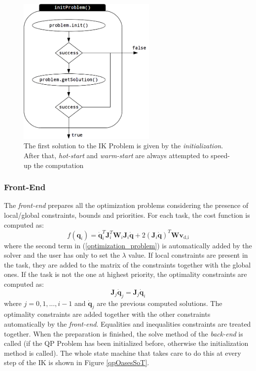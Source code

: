 \begin{figure}[htb] 
\centering 
\includegraphics[width=0.6\textwidth]{gfx/QPOasesProblem_init2.png} 
\caption{The first solution to the IK Problem is given by the \emph{initialization}. After that, \emph{hot-start} and \emph{warm-start} are always attempted to speed-up the computation} 
\label{qpOasesProblemInit}
\end{figure}

\subsubsection{Front-End}
The \emph{front-end} prepares all the optimization problems considering the presence of local/global constraints, bounds and priorities. For each task, the cost function is computed as:
\begin{equation}
f(\mathbf{q}_i) = \mathbf{\dot{q}}_i^T\mathbf{J}_i^T\mathbf{W}_i\mathbf{J}_i\mathbf{\dot{q}} + 2(\mathbf{J}_i\mathbf{\dot{q}})^T\mathbf{W}\mathbf{v}_\text{d,i}
\label{cost_function}
\end{equation}
where the second term in (\ref{optimization_problem}) is automatically added by the solver and the user has only to set the $\lambda$ value. If local constraints are present in the task, they are added to the matrix of the constraints together with the global ones. If the task is not the one at highest priority, the optimality constraints are computed as:
\begin{equation}
\mathbf{J}_{j}\mathbf{\dot{q}}_{j} = \mathbf{J}_{j}\mathbf{\dot{q}}_i
\label{optimality_constraints}
\end{equation}
where $j = 0, 1, ..., i-1$ and $\mathbf{\dot{q}}_{j}$ are the previous computed solutions. The optimality constraints are added together with the other constraints automatically by the \emph{front-end}. Equalities and inequalities constraints are treated together. When the preparation is finished, the solve method of the \emph{back-end} is called (if the QP Problem has been initialized before, otherwise the initialization method is called). The whole state machine that takes care to do this at every step of the IK is shown in Figure \ref{qpOasesSoT}. 

